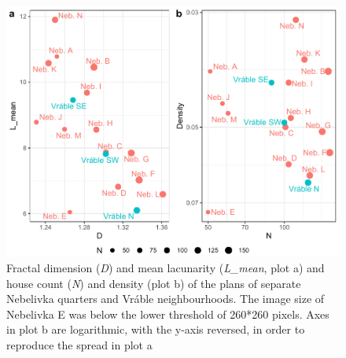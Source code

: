 \documentclass[
  12pt,
  a4paper, twoside]{book}
\begin{document}
\begin{figure}

{\centering \includegraphics[width=0.9\linewidth]{bookdown-demo_files/figure-latex/09-quart-points-1} 

}

\caption[D and L\_mean, N and density of quarter/neighbourhood images]{Fractal dimension (\emph{D}) and mean lacunarity (\emph{L\_mean}, plot a) and house count (\emph{N}) and density (plot b) of the plans of separate Nebelivka quarters and Vráble neighbourhoods. The image size of Nebelivka E was below the lower threshold of 260*260 pixels. Axes in plot b are logarithmic, with the y-axis reversed, in order to reproduce the spread in plot a}\label{fig:09-quart-points}
\end{figure}
\end{document}
